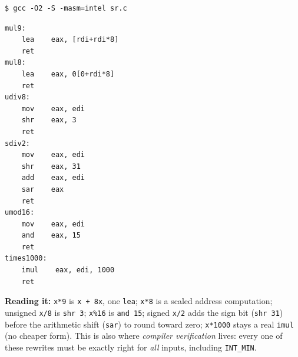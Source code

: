 \documentclass[10pt,a4paper,openany,oneside]{report}
\begin{document}
\begin{lstlisting}[style=shcmd]
$ gcc -O2 -S -masm=intel sr.c
\end{lstlisting}
\begin{lstlisting}[style=out]
mul9:
    lea    eax, [rdi+rdi*8]
    ret
mul8:
    lea    eax, 0[0+rdi*8]
    ret
udiv8:
    mov    eax, edi
    shr    eax, 3
    ret
sdiv2:
    mov    eax, edi
    shr    eax, 31
    add    eax, edi
    sar    eax
    ret
umod16:
    mov    eax, edi
    and    eax, 15
    ret
times1000:
    imul    eax, edi, 1000
    ret
\end{lstlisting}
\textbf{Reading it:} \texttt{x*9} is \texttt{x + 8x}, one \texttt{lea}; \texttt{x*8} is a scaled address computation; unsigned \texttt{x/8} is \texttt{shr 3}; \texttt{x\%16} is \texttt{and 15}; signed \texttt{x/2} adds the sign bit (\texttt{shr 31}) before the arithmetic shift (\texttt{sar}) to round toward zero; \texttt{x*1000} stays a real \texttt{imul} (no cheaper form). This is also where \emph{compiler verification} lives: every one of these rewrites must be exactly right for \emph{all} inputs, including \texttt{INT\_MIN}.
\end{document}
